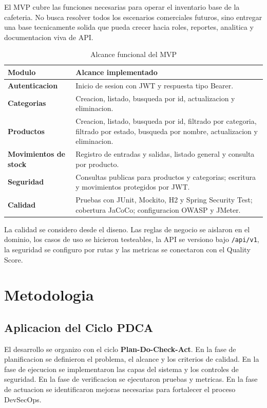 \documentclass[11pt,oneside]{article}
\begin{document}
El MVP cubre las funciones necesarias para operar el inventario base de la cafeteria. No busca resolver todos los escenarios comerciales futuros, sino entregar una base tecnicamente solida que pueda crecer hacia roles, reportes, analitica y documentacion viva de API.

\begin{table}[H]
\centering
\small
\caption{Alcance funcional del MVP}
\begin{tabularx}{\textwidth}{>{\bfseries}p{}Y}
\toprule
Modulo & Alcance implementado\\
\midrule
Autenticacion & Inicio de sesion con JWT y respuesta tipo Bearer.\\
Categorias & Creacion, listado, busqueda por id, actualizacion y eliminacion.\\
Productos & Creacion, listado, busqueda por id, filtrado por categoria, filtrado por estado, busqueda por nombre, actualizacion y eliminacion.\\
Movimientos de stock & Registro de entradas y salidas, listado general y consulta por producto.\\
Seguridad & Consultas publicas para productos y categorias; escritura y movimientos protegidos por JWT.\\
Calidad & Pruebas con JUnit, Mockito, H2 y Spring Security Test; cobertura JaCoCo; configuracion OWASP y JMeter.\\
\bottomrule
\end{tabularx}
\end{table}

La calidad se considero desde el diseno. Las reglas de negocio se aislaron en el dominio, los casos de uso se hicieron testeables, la API se versiono bajo \texttt{/api/v1}, la seguridad se configuro por rutas y las metricas se conectaron con el Quality Score.

\section{Metodologia}

\subsection{Aplicacion del Ciclo PDCA}

El desarrollo se organizo con el ciclo \textbf{Plan-Do-Check-Act}. En la fase de planificacion se definieron el problema, el alcance y los criterios de calidad. En la fase de ejecucion se implementaron las capas del sistema y los controles de seguridad. En la fase de verificacion se ejecutaron pruebas y metricas. En la fase de actuacion se identificaron mejoras necesarias para fortalecer el proceso DevSecOps.
\end{document}

